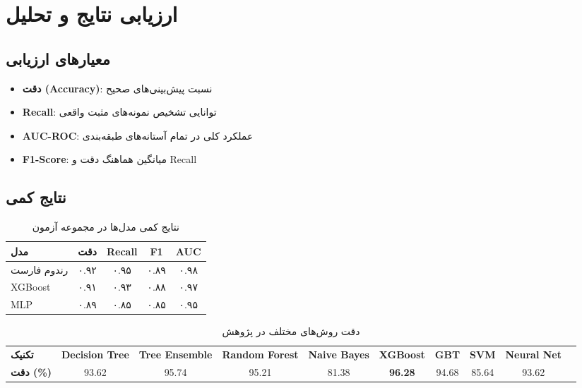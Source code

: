 \chapter{ارزیابی نتایج و تحلیل}
\section{معیارهای ارزیابی}
\begin{itemize}
    \item \textbf{دقت (Accuracy)}: نسبت پیش‌بینی‌های صحیح
    \item \textbf{Recall}: توانایی تشخیص نمونه‌های مثبت واقعی
    \item \textbf{AUC-ROC}: عملکرد کلی در تمام آستانه‌های طبقه‌بندی
    \item \textbf{F1-Score}: میانگین هماهنگ دقت و Recall
\end{itemize}

\section{نتایج کمی}
\begin{table}[h]
    \centering
    \begin{tabular}{|l|c|c|c|c|}
        \hline
        \textbf{مدل} & \textbf{دقت} & \textbf{Recall} & \textbf{F1} & \textbf{AUC} \\ \hline
        رندوم فارست & ۰.۹۲ & ۰.۹۵ & ۰.۸۹ & ۰.۹۸ \\ \hline
        XGBoost & ۰.۹۱ & ۰.۹۳ & ۰.۸۸ & ۰.۹۷ \\ \hline
        MLP & ۰.۸۹ & ۰.۸۵ & ۰.۸۵ & ۰.۹۵ \\ \hline
    \end{tabular}
    \caption{نتایج کمی مدل‌ها در مجموعه آزمون}
    \label{tab:results}
\end{table}

\begin{table}
    \centering
    \caption{دقت روش‌های مختلف در پژوهش }
    \label{tab:rdpm_results}
    \begin{tabular}{@{}lccccccccc@{}}
        \textbf{تکنیک} & \textbf{Decision Tree} & \textbf{Tree Ensemble} & \textbf{Random Forest} & \textbf{Naive Bayes} & \textbf{XGBoost} & \textbf{GBT} & \textbf{SVM} & \textbf{Neural Net} \\
        \textbf{دقت (\%)} & 93.62 & 95.74 & 95.21 & 81.38 & \textbf{96.28} & 94.68 & 85.64 & 93.62 \\
    \end{tabular}
\end{table}

